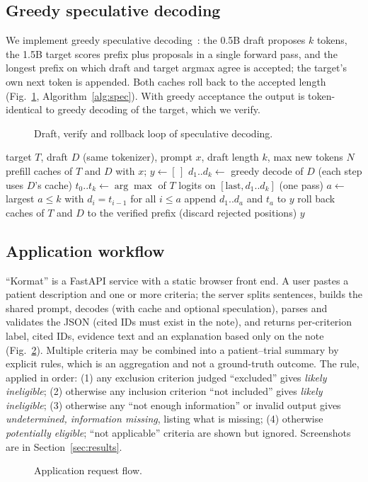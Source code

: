 \subsection{Greedy speculative decoding}
\label{sec:spec}
We implement greedy speculative decoding~\cite{leviathan2023speculative,chen2023speculative}: the 0.5B draft proposes $k$ tokens, the 1.5B target scores prefix plus proposals in a single forward pass, and the longest prefix on which draft and target argmax agree is accepted; the target's own next token is appended. Both caches roll back to the accepted length (Fig.~\ref{fig:spec}, Algorithm~\ref{alg:spec}). With greedy acceptance the output is token-identical to greedy decoding of the target, which we verify.
\begin{figure}[t]\centering
\resizebox{\columnwidth}{!}{}
\caption{Draft, verify and rollback loop of speculative decoding.}
\label{fig:spec}
\end{figure}
\begin{algorithm}[t]
\caption{Greedy speculative decoding}
\label{alg:spec}
\begin{algorithmic}[1]
\Require target $T$, draft $D$ (same tokenizer), prompt $x$, draft length $k$, max new tokens $N$
\State prefill caches of $T$ and $D$ with $x$; $y\gets[\,]$
  \State $d_1..d_k\gets$ greedy decode of $D$ (each step uses $D$'s cache)
  \State $t_0..t_k\gets \arg\max$ of $T$ logits on $[\text{last},d_1..d_k]$ (one pass)
  \State $a\gets$ largest $a\le k$ with $d_i=t_{i-1}$ for all $i\le a$
  \State append $d_1..d_a$ and $t_a$ to $y$
  \State roll back caches of $T$ and $D$ to the verified prefix (discard rejected positions)
\EndWhile
\State \Return $y$
\end{algorithmic}
\end{algorithm}

\subsection{Application workflow}
\label{sec:app}
``Kormat'' is a FastAPI service with a static browser front end. A user pastes a patient description and one or more criteria; the server splits sentences, builds the shared prompt, decodes (with cache and optional speculation), parses and validates the JSON (cited IDs must exist in the note), and returns per-criterion label, cited IDs, evidence text and an explanation based only on the note (Fig.~\ref{fig:app}). Multiple criteria may be combined into a patient--trial summary by explicit rules, which is an aggregation and not a ground-truth outcome. The rule, applied in order: (1) any exclusion criterion judged ``excluded'' gives \emph{likely ineligible}; (2) otherwise any inclusion criterion ``not included'' gives \emph{likely ineligible}; (3) otherwise any ``not enough information'' or invalid output gives \emph{undetermined, information missing}, listing what is missing; (4) otherwise \emph{potentially eligible}; ``not applicable'' criteria are shown but ignored. Screenshots are in Section~\ref{sec:results}.
\begin{figure}[t]\centering
\resizebox{\columnwidth}{!}{}
\caption{Application request flow.}
\label{fig:app}
\end{figure}
